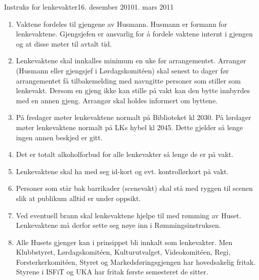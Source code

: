 \begin{instruks}{Instruks for lenkevakter}{16. desember 2010}{1. mars 2011}

    \begin{enumerate}
        \item Vaktene fordeles til gjengene av Husmann. Husmann er formann for
            lenkevaktene. Gjengsjefen er ansvarlig
            for å fordele vaktene internt i gjengen og at disse møter til avtalt tid.
        \item Lenkevaktene skal innkalles minimum en uke før arrangementet. Arrangør
            (Husmann eller gjengsjef i
            Lørdagskomit\'een) skal senest to dager før arrangementet få tilbakemelding med
            navngitte personer som
            stiller som lenkevakt. Dersom en gjeng ikke kan stille på vakt kan den bytte
            innbyrdes med en annen gjeng.
            Arrangør skal holdes informert om byttene.
        \item På fredager møter lenkevaktene normalt på Biblioteket kl 2030. På lørdager
            møter lenkevaktene normalt på
            LKs hybel kl 2045. Dette gjelder så lenge ingen annen beskjed er gitt.
        \item Det er totalt alkoholforbud for alle lenkevakter så lenge de er på vakt.
        \item Lenkevaktene skal ha med seg id-kort og evt. kontrollørkort på vakt.
        \item Personer som står bak barrikader (scenevakt) skal stå med ryggen til scenen
            slik at publikum alltid er under oppsikt.
        \item Ved eventuell brann skal lenkevaktene hjelpe til med rømming av Huset.
            Lenkevaktene må derfor sette seg nøye inn i Rømmingsinstruksen.
        \item Alle Husets gjenger kan i prinsippet bli innkalt som lenkevakter. Men
            Klubbstyret, Lørdagskomit\'een, Kulturutvalget, Videokomit\'een, Regi,
            Forsterkerkomit\'een, Styret og Markedsføringsgjengen har hovedsakelig fritak. 
            Styrene i ISFiT og UKA har fritak første semesteret de sitter.
    \end{enumerate}
\end{instruks}




